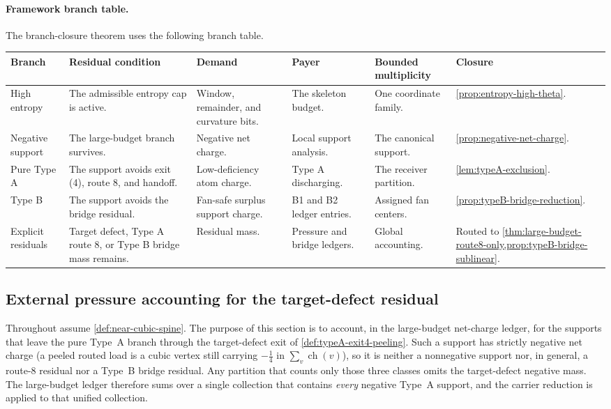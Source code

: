 \documentclass[11pt]{article}
\newcommand{\ch}{\operatorname{ch}}
\newcommand{\FrameworkBranchTableHeader}{%
\toprule
\textbf{Branch} & \textbf{Residual condition} & \textbf{Demand} & \textbf{Payer} & \textbf{Bounded multiplicity} & \textbf{Closure}\\
\midrule
}
\begin{document}
\paragraph{Framework branch table.}
The branch-closure theorem uses the following branch table.
\begin{longtable}{L{0.13\textwidth} L{0.19\textwidth} L{0.14\textwidth} L{0.14\textwidth} L{0.17\textwidth} L{0.17\textwidth}}
\FrameworkBranchTableHeader
High entropy
&
The admissible entropy cap is active.
&
Window, remainder, and curvature bits.
&
The skeleton budget.
&
One coordinate family.
&
\cref{prop:entropy-high-theta}.
\\
\addlinespace
Negative support
&
The large-budget branch survives.
&
Negative net charge.
&
Local support analysis.
&
The canonical support.
&
\cref{prop:negative-net-charge}.
\\
\addlinespace
Pure Type A
&
The support avoids exit \textup{(4)}, route 8, and handoff.
&
Low-deficiency atom charge.
&
Type A discharging.
&
The receiver partition.
&
\cref{lem:typeA-exclusion}.
\\
\addlinespace
Type B
&
The support avoids the bridge residual.
&
Fan-safe surplus support charge.
&
B1 and B2 ledger entries.
&
Assigned fan centers.
&
\cref{prop:typeB-bridge-reduction}.
\\
\addlinespace
Explicit residuals
&
Target defect, Type A route 8, or Type B bridge mass remains.
&
Residual mass.
&
Pressure and bridge ledgers.
&
Global accounting.
&
Routed to \cref{thm:large-budget-route8-only,prop:typeB-bridge-sublinear}.
\\
\bottomrule
\end{longtable}

\subsection{External pressure accounting for the target-defect residual}\label{sec:exit4-closure}

Throughout assume \cref{def:near-cubic-spine}.  The purpose of this section is to
account, in the large-budget net-charge ledger, for the supports that leave the
pure Type~A branch through the target-defect exit of
\cref{def:typeA-exit4-peeling}.  Such a support has strictly negative net charge
(a peeled routed load is a cubic vertex still carrying $-\tfrac14$ in
$\sum_v\ch(v)$), so it is neither a nonnegative support nor, in general, a
route-8 residual nor a Type~B bridge residual.  Any partition that counts only
those three classes omits the target-defect negative mass.  The large-budget
ledger therefore sums over a single collection that contains \emph{every}
negative Type~A support, and the carrier reduction is applied to that unified
collection.
\end{document}
